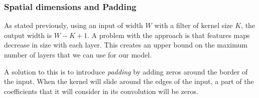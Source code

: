 \subsubsection{Spatial dimensions and Padding}
As stated previously, using an input of width $W$ with a filter of kernel size $K$, the output width is $W-K+1$. A problem with the approach is that features maps decrease in size with each layer. This creates an upper bound on the maximum number of layers that we can use for our model. 

A solution to this is to introduce \emph{padding} by adding zeros around the border of the input. When the kernel will slide around the edges of the input, a part of the coefficients that it will consider in its convolution will be zeros.
\begin{figure}[H]
    \centering
\end{figure}

